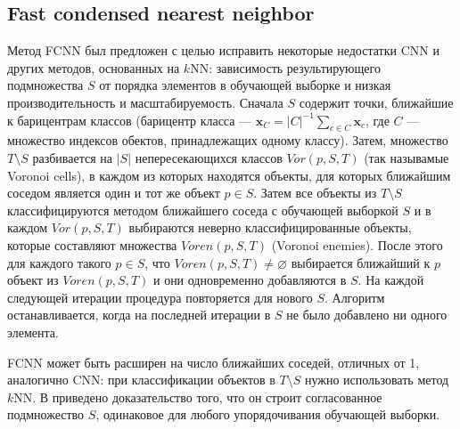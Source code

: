 \subsection{Fast condensed nearest neighbor}
Метод FCNN \cite{angiulli} был предложен с целью исправить некоторые недостатки CNN и других методов, основанных на \(k\)NN: зависимость результирующего подмножества \(S\) от порядка элементов в обучающей выборке и низкая производительность и масштабируемость. Сначала \(S\) содержит точки, ближайшие к барицентрам классов (барицентр класса --- \(\mathbf{x}_C=|C|^{-1}\sum_{c\in C}\mathbf{x}_c\), где \(C\) --- множество индексов обектов, принадлежащих одному классу). Затем, множество \(T\setminus S\) разбивается на \(|S|\) непересекающихся классов \(Vor(p, S, T)\) (так называмые Voronoi cells), в каждом из которых находятся объекты, для которых ближайшим соседом является один и тот же объект \(p\in S\). Затем все объекты из \(T\setminus S\) классифицируются методом ближайшего соседа с обучающей выборкой \(S\) и в каждом \(Vor(p, S, T)\) выбираются неверно классифицированные объекты, которые составляют множества \(Voren(p, S, T)\) (Voronoi enemies). После этого для каждого такого \(p\in S\), что \(Voren(p, S, T)\neq\varnothing\) выбирается ближайший к \(p\) объект из \(Voren(p, S, T)\) и они одновременно добавляются в \(S\). На каждой следующей итерации процедура повторяется для нового \(S\). Алгоритм останавливается, когда на последней итерации в \(S\) не было добавлено ни одного элемента.

FCNN может быть расширен на число ближайших соседей, отличных от 1, аналогично CNN: при классификации объектов в \(T\setminus S\) нужно использовать метод \(k\)NN. В \cite{angiulli} приведено доказательство того, что он строит согласованное подмножество \(S\), одинаковое для любого упорядочивания обучающей выборки.

